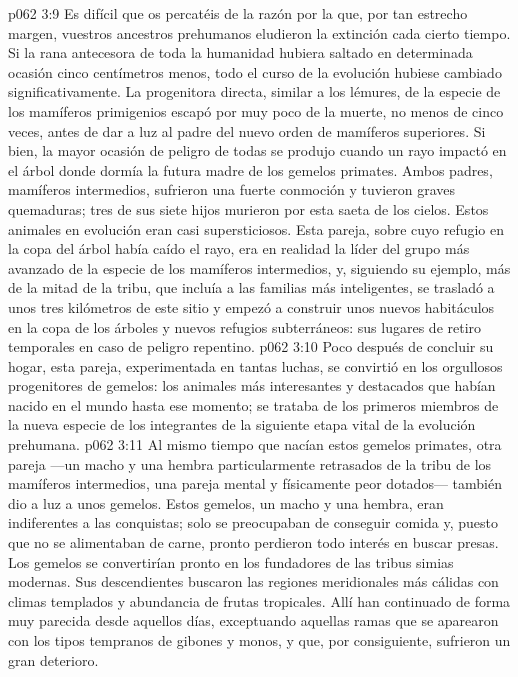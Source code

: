 \vs p062 3:9 \pc Es difícil que os percatéis de la razón por la que, por tan estrecho margen, vuestros ancestros prehumanos eludieron la extinción cada cierto tiempo. Si la rana antecesora de toda la humanidad hubiera saltado en determinada ocasión cinco centímetros menos, todo el curso de la evolución hubiese cambiado significativamente. La progenitora directa, similar a los lémures, de la especie de los mamíferos primigenios escapó por muy poco de la muerte, no menos de cinco veces, antes de dar a luz al padre del nuevo orden de mamíferos superiores. Si bien, la mayor ocasión de peligro de todas se produjo cuando un rayo impactó en el árbol donde dormía la futura madre de los gemelos primates. Ambos padres, mamíferos intermedios, sufrieron una fuerte conmoción y tuvieron graves quemaduras; tres de sus siete hijos murieron por esta saeta de los cielos. Estos animales en evolución eran casi supersticiosos. Esta pareja, sobre cuyo refugio en la copa del árbol había caído el rayo, era en realidad la líder del grupo más avanzado de la especie de los mamíferos intermedios, y, siguiendo su ejemplo, más de la mitad de la tribu, que incluía a las familias más inteligentes, se trasladó a unos tres kilómetros de este sitio y empezó a construir unos nuevos habitáculos en la copa de los árboles y nuevos refugios subterráneos: sus lugares de retiro temporales en caso de peligro repentino.
\vs p062 3:10 Poco después de concluir su hogar, esta pareja, experimentada en tantas luchas, se convirtió en los orgullosos progenitores de gemelos: los animales más interesantes y destacados que habían nacido en el mundo hasta ese momento; se trataba de los primeros miembros de la nueva especie de los  integrantes de la siguiente etapa vital de la evolución prehumana.
\vs p062 3:11 \pc Al mismo tiempo que nacían estos gemelos primates, otra pareja ---un macho y una hembra particularmente retrasados de la tribu de los mamíferos intermedios, una pareja mental y físicamente peor dotados--- también dio a luz a unos gemelos. Estos gemelos, un macho y una hembra, eran indiferentes a las conquistas; solo se preocupaban de conseguir comida y, puesto que no se alimentaban de carne, pronto perdieron todo interés en buscar presas. Los gemelos se convertirían pronto en los fundadores de las tribus simias modernas. Sus descendientes buscaron las regiones meridionales más cálidas con climas templados y abundancia de frutas tropicales. Allí han continuado de forma muy parecida desde aquellos días, exceptuando aquellas ramas que se aparearon con los tipos tempranos de gibones y monos, y que, por consiguiente, sufrieron un gran deterioro.
